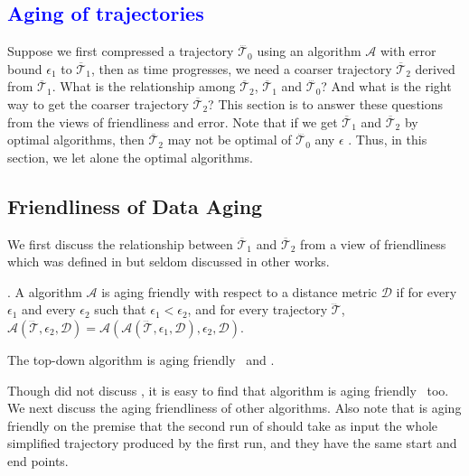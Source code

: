 
\textcolor{blue}{\section{Aging of trajectories}}

Suppose we first compressed a trajectory $\dddot{\mathcal{T}_0}$ using an \lsa algorithm $\mathcal{A}$ with error bound $\epsilon_1$ to $\overline{\mathcal{T}}_1$, then as time progresses, we need a coarser trajectory $\overline{\mathcal{T}}_2$ derived from $\overline{\mathcal{T}}_1$. 
What is the relationship among $\overline{\mathcal{T}}_2$, $\overline{\mathcal{T}}_1$ and $\dddot{\mathcal{T}_0}$? And what is the right way to get the coarser trajectory $\overline{\mathcal{T}}_2$?
%
This section is to answer these questions from the views of friendliness and error.
Note that if we get $\overline{\mathcal{T}}_1$ and $\overline{\mathcal{T}}_2$ by optimal algorithms, then $\overline{\mathcal{T}}_2$ may not be optimal of $\dddot{\mathcal{T}_0}$ \wrt any $\epsilon$ \cite{Cao:Spatio}. Thus, in this section, we let alone the optimal algorithms.

\subsection{Friendliness of Data Aging}
We first discuss the relationship between $\overline{\mathcal{T}}_1$ and $\overline{\mathcal{T}}_2$ from a view of friendliness which was defined in \cite{Cao:Spatio} but seldom discussed in other works.
	
. {A \lsa algorithm $\mathcal{A}$ is aging friendly with respect to a distance metric $\mathcal{D}$ if for every $\epsilon_1$ and every $\epsilon_2$ such that $\epsilon_1 < \epsilon_2$, and for every trajectory $\dddot{\mathcal{T}}$, $\mathcal{A}(\dddot{\mathcal{T}}, \epsilon_2, \mathcal{D})= \mathcal{A}(\mathcal{A}(\dddot{\mathcal{T}}, \epsilon_1, \mathcal{D}), \epsilon_2, \mathcal{D})$.}


\begin{theorem}
	\label{theo-aging-tp}
	The top-down algorithm \dpa is aging friendly \wrt~\ped and \sed\cite{Cao:Spatio}.
\end{theorem}
	
Though \cite{Cao:Spatio} did not discuss \dad, it is easy to find that algorithm \dpa is aging friendly \wrt~\dad too. 
We next discuss the aging friendliness of other algorithms.
Also note that \dpa is aging friendly on the premise that the second run of \dpa should take as input the whole simplified trajectory produced by the first run, and they have the same start and end points. 


